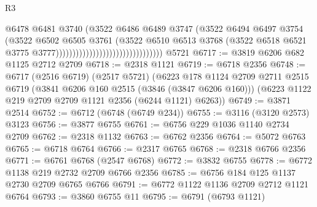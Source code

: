 \begin{lexlean}{R3}
\begin{coremodule}
                                                          @6478
                                                          @6481
                                                          @3740
                                                          (@3522
                                                            @6486
                                                            @6489
                                                            @3747
                                                            (@3522
                                                              @6494
                                                              @6497
                                                              @3754
                                                              (@3522
                                                                @6502
                                                                @6505
                                                                @3761
                                                                (@3522
                                                                  @6510
                                                                  @6513
                                                                  @3768
                                                                  (@3522
                                                                    @6518
                                                                    @6521
                                                                    @3775
                                                                    @3777))))))))))))))))))))))))))))))))
    @5721
@6717 := @3819 @6206 @682 @1125 @2712 @2709
@6718 := @2318 @1121
@6719 := @6718 @2356
@6748 := @6717
    (@2516 @6719)
    (@2517 @5721)
    (@6223
      @178
      @1124
      @2709
      @2711
      @2515
      @6719
      (@3841 @6206 @160 @2515 (@3846 (@3847 @6206 @160)))
      (@6223 @1122 @219 @2709 @2709 @1121 @2356 (@6244 @1121) @6263))
@6749 := @3871 @2514
@6752 := @6712 (@6748 (@6749 @234))
@6755 := @3116 (@3120 @2573) @3123
@6756 := @3877 @6755
@6761 := @6756 @229 @1036 @1140 @2734 @2709
@6762 := @2318 @1132
@6763 := @6762 @2356
@6764 := @5072 @6763
@6765 := @6718 @6764
@6766 := @2317 @6765
@6768 := @2318 @6766 @2356
@6771 := @6761 @6768 (@2547 @6768)
@6772 := @3832 @6755
@6778 := @6772 @1138 @219 @2732 @2709 @6766 @2356
@6785 := @6756 @184 @125 @1137 @2730 @2709 @6765 @6766
@6791 := @6772 @1122 @1136 @2709 @2712 @1121 @6764
@6793 := @3860 @6755 @11
@6795 := @6791 (@6793 @1121)

\end{coremodule}
\end{lexlean}
